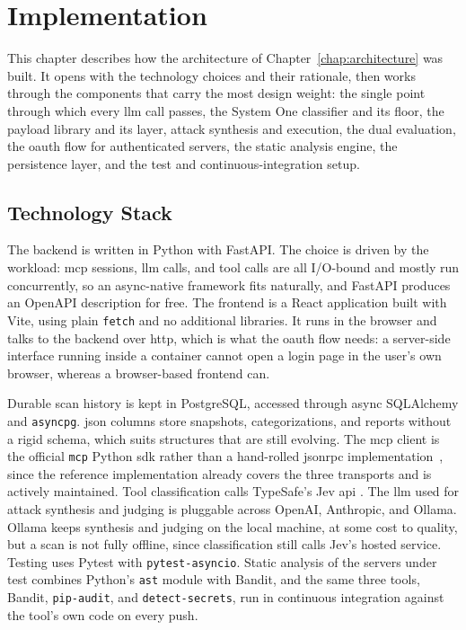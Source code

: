 \chapter{Implementation}
\label{chap:implementation}


This chapter describes how the architecture of Chapter~\ref{chap:architecture} was built. It opens with the technology choices and their rationale, then works through the components that carry the most design weight: the single point through which every \gls{llm} call passes, the System One classifier and its floor, the payload library and its  layer, attack synthesis and execution, the dual evaluation, the \gls{oauth} flow for authenticated servers, the static analysis engine, the persistence layer, and the test and continuous-integration setup.

\section{Technology Stack}
\label{sec:stack}

The backend is written in Python with FastAPI. The choice is driven by the workload: \gls{mcp} sessions, \gls{llm} calls, and tool calls are all I/O-bound and mostly run concurrently, so an async-native framework fits naturally, and FastAPI produces an OpenAPI description for free. The frontend is a React application built with Vite, using plain \texttt{fetch} and no additional libraries. It runs in the browser and talks to the backend over \gls{http}, which is what the \gls{oauth} flow needs: a server-side interface running inside a container cannot open a login page in the user's own browser, whereas a browser-based frontend can.

Durable scan history is kept in PostgreSQL, accessed through async SQLAlchemy and \texttt{asyncpg}. \gls{json} columns store snapshots, categorizations, and reports without a rigid schema, which suits structures that are still evolving. The \gls{mcp} client is the official \texttt{mcp} Python \gls{sdk} rather than a hand-rolled \gls{jsonrpc} implementation~\cite{anthropic2024mcp}, since the reference implementation already covers the three transports and is actively maintained. Tool classification calls TypeSafe's Jev \gls{api} \citep{typesafe2026systemone}. The \gls{llm} used for attack synthesis and judging is pluggable across OpenAI, Anthropic, and Ollama. Ollama keeps synthesis and judging on the local machine, at some cost to quality, but a scan is not fully offline, since classification still calls Jev's hosted service. Testing uses Pytest with \texttt{pytest-asyncio}. Static analysis of the servers under test combines Python's \texttt{ast} module with Bandit, and the same three tools, Bandit, \texttt{pip-audit}, and \texttt{detect-secrets}, run in continuous integration against the tool's own code on every push.


